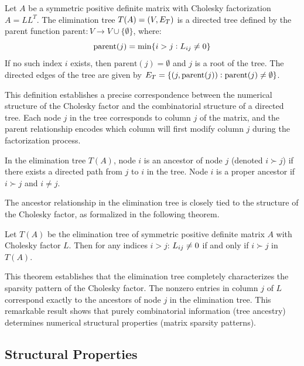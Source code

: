 \begin{definition}
Let $A$ be a symmetric positive definite matrix with Cholesky factorization $A = LL^T$. The elimination tree $T(A) = (V, E\sb{T})$ is a directed tree defined by the parent function $\text{parent}: V \to V \cup \{\emptyset\}$, where:
\begin{equation}
    \text{parent}(j) = \min\{i > j : L\sb{ij} \neq 0\}
\end{equation}
If no such index $i$ exists, then $\text{parent}(j) = \emptyset$ and $j$ is a root of the tree. The directed edges of the tree are given by $E\sb{T} = \{(j, \text{parent}(j)) : \text{parent}(j) \neq \emptyset\}$.
\end{definition}

This definition establishes a precise correspondence between the numerical structure of the Cholesky factor and the combinatorial structure of a directed tree. Each node $j$ in the tree corresponds to column $j$ of the matrix, and the parent relationship encodes which column will first modify column $j$ during the factorization process.

\begin{definition}
In the elimination tree $T(A)$, node $i$ is an ancestor of node $j$ (denoted $i \succ j$) if there exists a directed path from $j$ to $i$ in the tree. Node $i$ is a proper ancestor if $i \succ j$ and $i \neq j$.
\end{definition}

The ancestor relationship in the elimination tree is closely tied to the structure of the Cholesky factor, as formalized in the following theorem.

\begin{theorem}
Let $T(A)$ be the elimination tree of symmetric positive definite matrix $A$ with Cholesky factor $L$. Then for any indices $i > j$: $L\sb{ij} \neq 0$ if and only if $i \succ j$ in $T(A)$.
\end{theorem}

This theorem establishes that the elimination tree completely characterizes the sparsity pattern of the Cholesky factor. The nonzero entries in column $j$ of $L$ correspond exactly to the ancestors of node $j$ in the elimination tree. This remarkable result shows that purely combinatorial information (tree ancestry) determines numerical structural properties (matrix sparsity patterns).

\subsection{Structural Properties}

